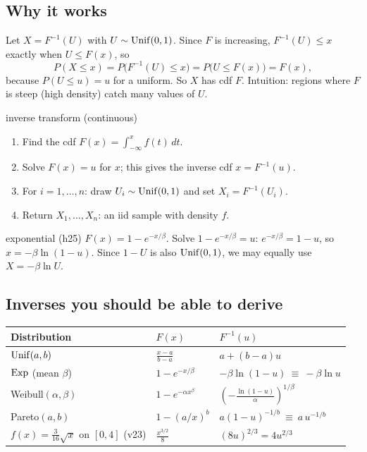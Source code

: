 \subsection{Why it works}
Let $X = F^{-1}(U)$ with $U\sim\mathrm{Unif}(0,1)$. Since $F$ is increasing, $F^{-1}(U)\le x$ exactly when $U \le F(x)$, so
\[
P(X \le x) = P\big(F^{-1}(U) \le x\big) = P\big(U \le F(x)\big) = F(x),
\]
because $P(U\le u) = u$ for a uniform. So $X$ has cdf $F$. Intuition: regions where $F$ is steep (high density) catch many values of $U$.

\begin{algo}{inverse transform (continuous)}
\begin{enumerate}
  \item Find the cdf $F(x) = \int_{-\infty}^x f(t)\,dt$.
  \item Solve $F(x) = u$ for $x$; this gives the inverse cdf $x = F^{-1}(u)$.
  \item For $i = 1,\dots,n$: draw $U_i \sim\mathrm{Unif}(0,1)$ and set $X_i = F^{-1}(U_i)$.
  \item Return $X_1,\dots,X_n$: an iid sample with density $f$.
\end{enumerate}
\end{algo}

\begin{example}{exponential (h25)}
$F(x) = 1-e^{-x/\beta}$. Solve $1 - e^{-x/\beta} = u$: $e^{-x/\beta} = 1-u$, so $x = -\beta\ln(1-u)$.
Since $1-U$ is also $\mathrm{Unif}(0,1)$, we may equally use $X = -\beta\ln U$.
\end{example}

\subsection{Inverses you should be able to derive}
\begin{center}
\begin{tabular}{lll}
\toprule
Distribution & $F(x)$ & $F^{-1}(u)$ \\
\midrule
$\mathrm{Unif}(a,b)$ & $\frac{x-a}{b-a}$ & $a + (b-a)u$ \\
$\mathrm{Exp}$ (mean $\beta$) & $1-e^{-x/\beta}$ & $-\beta\ln(1-u)\ \equiv\ -\beta\ln u$ \\
Weibull$(\alpha,\beta)$ & $1-e^{-\alpha x^\beta}$ & $\left(-\frac{\ln(1-u)}{\alpha}\right)^{1/\beta}$ \\
Pareto$(a,b)$ & $1-(a/x)^b$ & $a(1-u)^{-1/b}\ \equiv\ a\,u^{-1/b}$ \\
$f(x) = \frac{3}{16}\sqrt x$ on $[0,4]$ (v23) & $\frac{x^{3/2}}{8}$ & $(8u)^{2/3} = 4u^{2/3}$ \\
\bottomrule
\end{tabular}
\end{center}

